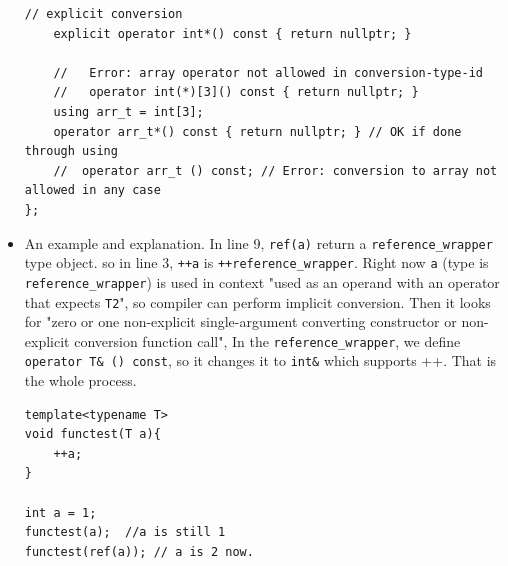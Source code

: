 \documentclass[a4paper,11pt,twoside]{book}
\begin{document}
\begin{itemize}
\begin{lstlisting}[numbers=none]
	// explicit conversion
	explicit operator int*() const { return nullptr; }
	
	//   Error: array operator not allowed in conversion-type-id
	//   operator int(*)[3]() const { return nullptr; }
	using arr_t = int[3];
	operator arr_t*() const { return nullptr; } // OK if done through using
	//  operator arr_t () const; // Error: conversion to array not allowed in any case
};
\end{lstlisting}	
	
	\item An example and explanation. In line 9, \texttt{ref(a)} return a \texttt{reference\_wrapper} type object. so in line 3, \texttt{++a} is \texttt{++reference\_wrapper}. Right now \texttt{a} (type is \texttt{reference\_wrapper}) is used in context "used as an operand with an operator that expects \texttt{T2}", so compiler can perform implicit conversion. Then it looks for "zero or one non-explicit single-argument converting constructor or non-explicit conversion function call", In the \texttt{reference\_wrapper}, we define \texttt{operator T\& () const}, so it changes it to \texttt{int\&} which supports ++. That is the whole process. 
\begin{lstlisting}[]
template<typename T>
void functest(T a){
	++a;
}

int a = 1;
functest(a);  //a is still 1
functest(ref(a)); // a is 2 now.	 
\end{lstlisting}	
	
\end{itemize}
\end{document}
